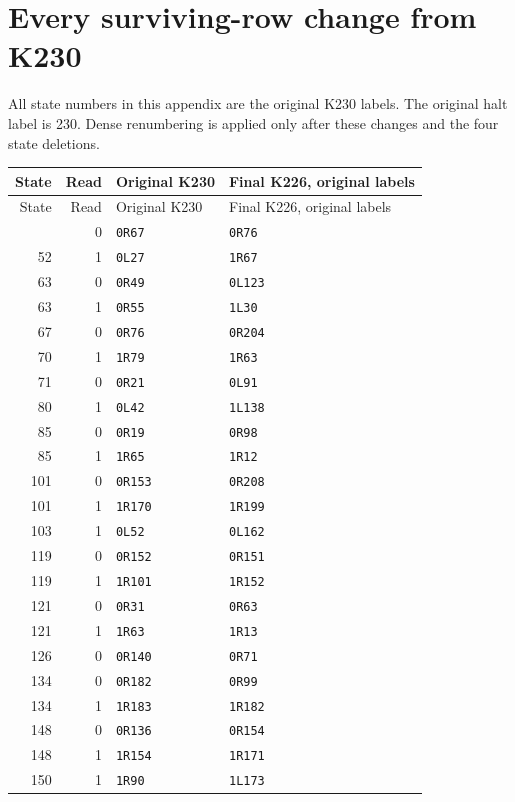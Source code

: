 \section{Every surviving-row change from K230}
\label{app:delta}
All state numbers in this appendix are the original K230 labels.
The original halt label is 230. Dense renumbering is applied only
after these changes and the four state deletions.
\begin{longtable}{@{}rrll@{}}
\toprule State & Read & Original K230 & Final K226, original labels\\\midrule
\endfirsthead
\toprule State & Read & Original K230 & Final K226, original labels\\\midrule
\endhead
\bottomrule\endfoot
52 & 0 & \texttt{0R67} & \texttt{0R76}\\
52 & 1 & \texttt{0L27} & \texttt{1R67}\\
63 & 0 & \texttt{0R49} & \texttt{0L123}\\
63 & 1 & \texttt{0R55} & \texttt{1L30}\\
67 & 0 & \texttt{0R76} & \texttt{0R204}\\
70 & 1 & \texttt{1R79} & \texttt{1R63}\\
71 & 0 & \texttt{0R21} & \texttt{0L91}\\
80 & 1 & \texttt{0L42} & \texttt{1L138}\\
85 & 0 & \texttt{0R19} & \texttt{0R98}\\
85 & 1 & \texttt{1R65} & \texttt{1R12}\\
101 & 0 & \texttt{0R153} & \texttt{0R208}\\
101 & 1 & \texttt{1R170} & \texttt{1R199}\\
103 & 1 & \texttt{0L52} & \texttt{0L162}\\
119 & 0 & \texttt{0R152} & \texttt{0R151}\\
119 & 1 & \texttt{1R101} & \texttt{1R152}\\
121 & 0 & \texttt{0R31} & \texttt{0R63}\\
121 & 1 & \texttt{1R63} & \texttt{1R13}\\
126 & 0 & \texttt{0R140} & \texttt{0R71}\\
134 & 0 & \texttt{0R182} & \texttt{0R99}\\
134 & 1 & \texttt{1R183} & \texttt{1R182}\\
148 & 0 & \texttt{0R136} & \texttt{0R154}\\
148 & 1 & \texttt{1R154} & \texttt{1R171}\\
150 & 1 & \texttt{1R90} & \texttt{1L173}\\

\end{longtable}
